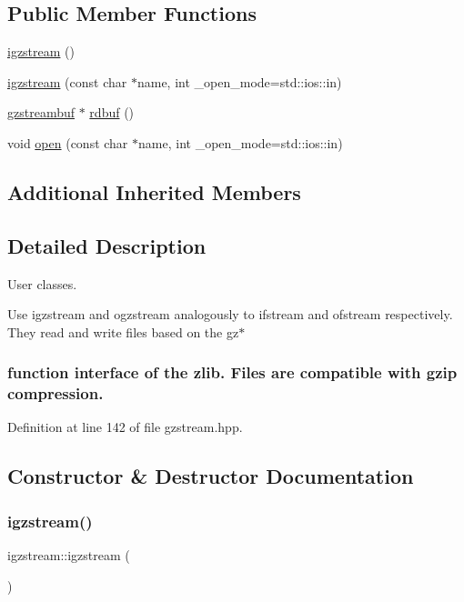 \subsection*{Public Member Functions}
\begin{DoxyCompactItemize}
\item 
\hyperlink{classigzstream_ab34b2a8094155903a7f032ca9e518672}{igzstream} ()
\item 
\hyperlink{classigzstream_ae94e48ef452b7009e93a814c48e5924e}{igzstream} (const char $\ast$name, int \+\_\+open\+\_\+mode=std\+::ios\+::in)
\item 
\hyperlink{classgzstreambuf}{gzstreambuf} $\ast$ \hyperlink{classigzstream_a8aa14802072efefc34d72b1bbbc56d5d}{rdbuf} ()
\item 
void \hyperlink{classigzstream_afce1810a57bef9b7ebf9e67c645fa6b9}{open} (const char $\ast$name, int \+\_\+open\+\_\+mode=std\+::ios\+::in)
\end{DoxyCompactItemize}
\subsection*{Additional Inherited Members}


\subsection{Detailed Description}


 User classes. 

Use igzstream and ogzstream analogously to ifstream and ofstream respectively. They read and write files based on the gz$\ast$ \subsubsection*{function interface of the zlib. Files are compatible with gzip compression. }

Definition at line 142 of file gzstream.\+hpp.



\subsection{Constructor \& Destructor Documentation}
\mbox{\label{classigzstream_ab34b2a8094155903a7f032ca9e518672}} 
\subsubsection{\texorpdfstring{igzstream()}{igzstream()}\hspace{0.1cm}{\footnotesize\ttfamily [1/2]}}
{\footnotesize\ttfamily igzstream\+::igzstream (\begin{DoxyParamCaption}{ }\end{DoxyParamCaption})\hspace{0.3cm}{\ttfamily [inline]}}



